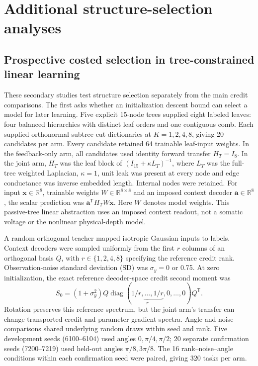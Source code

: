 \section{Additional structure-selection analyses}
\label{note:selection_statistics}

\subsection{Prospective costed selection in tree-constrained linear learning}
\label{note:prospective_selection}

These secondary studies test structure selection separately from the main
credit comparisons. The first asks whether an initialization descent bound
can select a model for later learning. Five explicit 15-node trees supplied
eight labeled leaves: four balanced hierarchies with distinct leaf orders
and one contiguous comb. Each supplied orthonormal subtree-cut dictionaries
at $K=1,2,4,8$, giving 20 candidates per arm. Every candidate retained 64
trainable leaf-input weights. In the feedback-only arm, all candidates used
identity forward transfer $H_T=I_8$. In the joint arm, $H_T$ was the leaf
block of $(I_{15}+\kappa L_T)^{-1}$, where $L_T$ was the full-tree weighted
Laplacian, $\kappa=1$, unit leak was present at every node and edge
conductance was inverse embedded length. Internal nodes were retained.
For input $\bm x\in\mathbb R^8$, trainable weights
$W\in\mathbb R^{8\times8}$ and an imposed context decoder
$\bm a\in\mathbb R^8$, the scalar prediction was
$\bm a^{\mathsf T}H_TW\bm x$. Here $W$ denotes model weights. This passive-tree linear abstraction uses an imposed context readout, not a somatic voltage or the nonlinear physical-depth model.

A random orthogonal teacher mapped isotropic Gaussian inputs to labels.
Context decoders were sampled uniformly from the first $r$ columns of an
orthogonal basis $Q$, with $r\in\{1,2,4,8\}$ specifying the reference
credit rank. Observation-noise standard deviation (SD) was $\sigma_y=0$
or 0.75. At zero initialization, the exact reference
decoder-space credit second moment was
\[
S_0=(1+\sigma_y^2)Q\operatorname{diag}
(\underbrace{1/r,\ldots,1/r}_{r},0,\ldots,0)Q^{\mathsf T}.
\]
Rotation preserves this reference spectrum, but the joint arm's transfer can change transported-credit and parameter-gradient spectra. Angle and noise
comparisons shared underlying random draws within seed and rank. Five
development seeds (6100--6104) used angles $0,\pi/4,\pi/2$; 20 separate
confirmation seeds (7200--7219) used held-out angles $\pi/8,3\pi/8$.
The 16 rank--noise--angle conditions within each confirmation seed were
paired, giving 320 tasks per arm.

